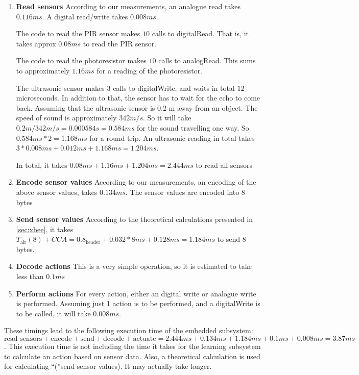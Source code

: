  \begin{enumerate}
  \item \textbf{Read sensors} According to our measurements, an analogue read takes $0.116 ms$. A digital read/write takes $0.008 ms$. 

The code to read the PIR sensor makes $10$ calls to digitalRead. That is, it takes approx $0.08 ms$ to read the PIR sensor. 

The code to read the photoresistor makes $10$ calls to analogRead. This sums to approximately $1.16 ms$ for a reading of the photoresistor. 

The ultrasonic sensor makes $3$ calls to digitalWrite, and waits in total $12$ microseconds. In addition to that, the sensor has to wait for the echo to come back. Assuming that the ultrasonic sensor is $0.2$ m away from an object. The speed of sound is approximately $342 m/s$. So it will take $0.2 m / 342 m/s = 0.000584 s = 0.584 ms$ for the sound travelling one way. So $0.584 ms * 2 = 1.168 ms$ for a round trip. An ultrasonic reading in total takes $3 * 0.008 ms + 0.012 ms + 1.168 ms = 1.204 ms$. 

In total, it takes $0.08 ms + 1.16 ms + 1.204 ms = 2.444 ms$ to read all sensors
  \item \textbf{Encode sensor values} According to our measurements, an encoding of the above sensor values, takes $0.134 ms$. The sensor values are encoded into 8 bytes
  \item \textbf{Send sensor values} According to the theoretical calculations presented in \cref{sec:xbee}, it takes $T_{\text{air}}(8) + CCA = 0.8_{\text{header}} + 0.032*8 ms + 0.128 ms = 1.184 ms$ to send 8 bytes.
  \item \textbf{Decode actions} This is a very simple operation, so it is estimated to take less than $0.1 ms$
  \item \textbf{Perform actions} For every action, either an digital write or analogue write is performed. Assuming just 1 action is to be performed, and a digitalWrite is to be called, it will take $0.008 ms$.
\end{enumerate}

These timings lead to the following execution time of the embedded subsystem: $\text{read sensors} + \text{encode} + \text{send} + \text{decode} + \text{actuate} = 2.444 ms + 0.134 ms + 1.184 ms + 0.1 ms + 0.008 ms = 3.87 ms$. This execution time is not including the time it takes for the learning subsystem to calculate an action based on sensor data. Also, a theoretical calculation is used for calculating \enquote(send sensor values). It may actually take longer.
